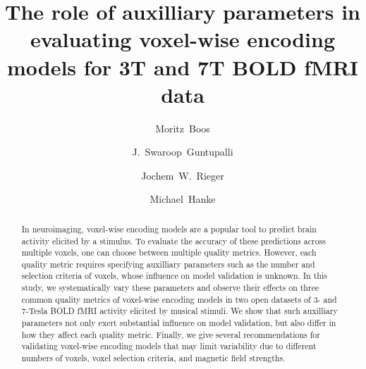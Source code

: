 
\newcommand{\beginsupplement}{%
        \setcounter{table}{0}
        \renewcommand{\thetable}{S\arabic{table}}%
        \setcounter{figure}{0}
        \renewcommand{\thefigure}{S\arabic{figure}}%
     }




\title{The role of auxilliary parameters in evaluating voxel-wise encoding models for 3T and 7T BOLD fMRI data}


\author[1]{Moritz~Boos}
\author[2]{J.~Swaroop~Guntupalli}
\author[1]{Jochem~W.~Rieger}
\author[3,4]{Michael~Hanke}

\maketitle

\begin{abstract}
In neuroimaging, voxel-wise encoding models are a popular tool to predict brain activity elicited by a stimulus.
To evaluate the accuracy of these predictions across multiple voxels, one can choose between multiple quality metrics.
However, each quality metric requires specifying auxilliary parameters such as the number and selection criteria of voxels, whose influence on model validation is unknown.
In this study, we systematically vary these parameters and observe their effects on three common quality metrics of voxel-wise encoding models in two open datasets of 3- and 7-Tesla BOLD fMRI activity elicited by musical stimuli.
We show that such auxilliary parameters not only exert substantial influence on model validation, but also differ in how they affect each quality metric.
Finally, we give several recommendations for validating voxel-wise encoding models that may limit variability due to different numbers of voxels, voxel selection criteria, and magnetic field strengths.
\end{abstract}

\clearpage


